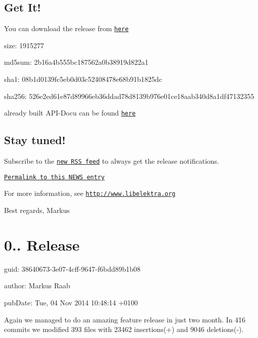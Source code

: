 \subsection*{Get It!}

You can download the release from \href{http://www.markus-raab.org/ftp/elektra/releases/elektra-0.8.10.tar.gz}{\tt here}


\begin{DoxyItemize}
\item size\+: 1915277
\item md5sum\+: 2b16a4b555bc187562a0b38919d822a1
\item sha1\+: 08b1d0139fc5eb0d03c52408478e68b91b1825dc
\item sha256\+: 526e2ed61e87d89966eb36ddad78d8139b976e01ce18aab340d8a1df47132355
\end{DoxyItemize}

already built A\+P\+I-\/\+Docu can be found \href{http://doc.libelektra.org/api/0.8.10/html/}{\tt here}

\subsection*{Stay tuned!}

Subscribe to the \href{http://doc.libelektra.org/news/feed.rss}{\tt new R\+S\+S feed} to always get the release notifications.

\href{http://doc.libelektra.org/news/6ce57ecf-420a-4a31-821e-1c5fe5532eb4.html}{\tt Permalink to this N\+E\+W\+S entry}

For more information, see \href{http://www.libelektra.org}{\tt http\+://www.\+libelektra.\+org}

Best regards, Markus

\section*{0.. Release}


\begin{DoxyItemize}
\item guid\+: 38640673-\/3e07-\/4cff-\/9647-\/f6bdd89b1b08
\item author\+: Markus Raab
\item pub\+Date\+: Tue, 04 Nov 2014 10\+:48\+:14 +0100
\end{DoxyItemize}

Again we managed to do an amazing feature release in just two month. In 416 commits we modified 393 files with 23462 insertions(+) and 9046 deletions(-\/).

